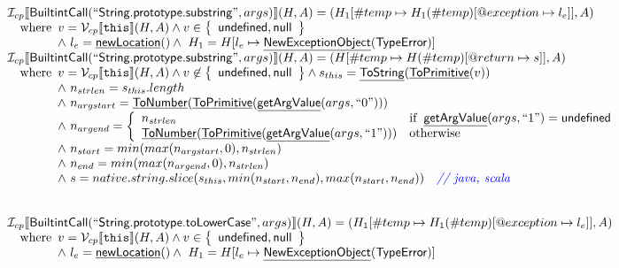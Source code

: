 \documentclass{article}
\makeatletter
\newcommand{\SF}[1]{\mbox{\textsf{#1}}}
\newcommand{\TT}[1]{\mbox{\texttt{#1}}}
\newcommand{\comment}[1]{\textit{#1}}
\newcommand{\wherec}[1]{{\rm where}\begin{array}[t]{l}#1\end{array}}
\newcommand{\ifc}[1]{{\rm if}\begin{array}[t]{l}#1\end{array}}
\newcommand{\owc}{{\rm otherwise}}
\newcommand{\I}{\mathcal{I}}
\newcommand{\V}{\mathcal{V}}
\newcommand{\set}[1]{\left\{\begin{array}{l}#1\end{array}\right\}}
\newcommand{\lbr}{\llbracket}
\newcommand{\rbr}{\rrbracket}
\newcommand{\hf}[1]{\underline{\sf #1}}
\newcommand{\varloc}[1]{\##1}
\newcommand{\varprop}[1]{@#1}
\def\inblue{\color{blue}}
\def\inblue{\color{blue}}
\makeatother
\begin{document}
\[
\begin{array}{l}
\I _{cp}\lbr \SF{BuiltintCall}(``\SF{String.prototype.substring}",args)\rbr(H,A)
 = (H_1[\varloc{temp}\mapsto H_1(\varloc{temp})[\varprop{exception}\mapsto l_e]], A) \\
\quad\wherec{
  v = \V _{cp}\lbr \TT{this}\rbr (H,A) \land v \in \set{\SF{undefined}, \SF{null}}\\
  \land\ l_e = \hf{newLocation}() \land\ H_1=H[l_e\mapsto\hf{NewExceptionObject}(\SF{TypeError})] 
  }\\
  
\I _{cp}\lbr \SF{BuiltintCall}(``\SF{String.prototype.substring}",args)\rbr(H,A)
 = (H[\varloc{temp}\mapsto H(\varloc{temp})[\varprop{return}\mapsto s]], A) \\
\quad\wherec{
  v = \V _{cp}\lbr \TT{this}\rbr (H,A) \land v \not\in \set{\SF{undefined}, \SF{null}}
  \land s_{this} = \hf{ToString}(\hf{ToPrimitive}(v))\\
  \land\ n_{strlen} = s_{this}.length\\
  \land\ n_{argstart} = \hf{ToNumber}(\hf{ToPrimitive}(\hf{getArgValue}(args, ``0")))\\
  \land\ n_{argend} = \left\{\begin{array}{ll}
      n_{strlen} & \ifc{\hf{getArgValue}(args, ``1") = \SF{undefined}}\\
      \hf{ToNumber}(\hf{ToPrimitive}(\hf{getArgValue}(args, ``1"))) & \owc
    \end{array}\right.\\
  \land\ n_{start} = min(max(n_{argstart},0), n_{strlen})\\
  \land\ n_{end} = min(max(n_{argend},0), n_{strlen})\\
  \land\ s = native.string.slice(s_{this}, min(n_{start},n_{end}), max(n_{start},n_{end})) \quad\comment{{\inblue // java, scala}}\\
  }\\
\\\\


\I _{cp}\lbr \SF{BuiltintCall}(``\SF{String.prototype.toLowerCase}",args)\rbr(H,A)
 = (H_1[\varloc{temp}\mapsto H_1(\varloc{temp})[\varprop{exception}\mapsto l_e]], A) \\
\quad\wherec{
  v = \V _{cp}\lbr \TT{this}\rbr (H,A) \land v \in \set{\SF{undefined}, \SF{null}}\\
  \land\ l_e = \hf{newLocation}() \land\ H_1=H[l_e\mapsto\hf{NewExceptionObject}(\SF{TypeError})] 
  }\\
  

\end{array}\]
\end{document}
